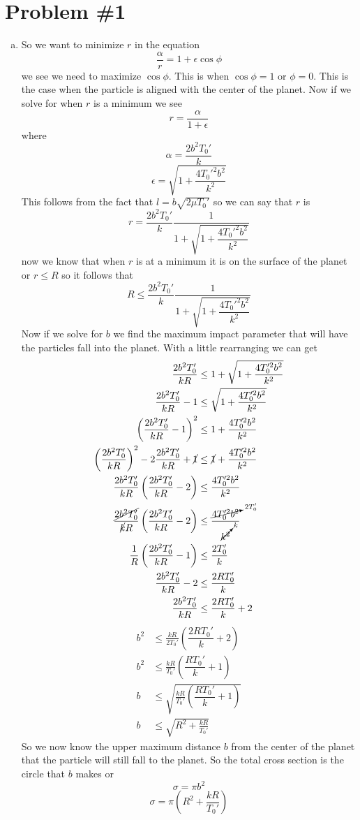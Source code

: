 \documentclass[11pt]{article}
\numberwithin{equation}{section}
\begin{document}


\section{Problem \#1}
\begin{enumerate}[(a)]
\item
So we want to minimize $r$ in the equation
$$\frac{\alpha}{r} = 1+\epsilon\cos\phi$$
we see we need to maximize $\cos\phi$. This is when $\cos\phi=1$ or $\phi=0$. This is the case when the particle is aligned with the center of the planet. Now if we solve for when $r$ is a minimum we see
$$r=\frac{\alpha}{1+\epsilon}$$
where
$$\alpha = \frac{2b^2 T_0'}{k}$$
$$\epsilon = \sqrt{1+\frac{4T_0'^2b^2}{k^2}}$$
This follows from the fact that $l=b\sqrt{2\mu T_0'}$ so we can say that $r$ is
$$r= \frac{2b^2 T_0'}{k}\frac{1}{1+\sqrt{1+\dfrac{4T_0'^2b^2}{k^2}}}$$
now we know that when $r$ is at a minimum it is on the surface of the planet or $r\le R$ so it follows that
$$R \le \frac{2b^2 T_0'}{k}\frac{1}{1+\sqrt{1+\dfrac{4T_0'^2b^2}{k^2}}}$$
Now if we solve for $b$ we find the maximum impact parameter that will have the particles fall into the planet. With a little rearranging we can get
\begin{align*}
\frac{2b^2 T_0'}{kR} &\le {1+\sqrt{1+\dfrac{4T_0'^2b^2}{k^2}}}\\
\frac{2b^2 T_0'}{kR} -1 &\le \sqrt{1+\dfrac{4T_0'^2b^2}{k^2}}\\
\left(\frac{2b^2 T_0'}{kR} -1\right)^2 &\le 1+\dfrac{4T_0'^2b^2}{k^2}\\
\left(\frac{2b^2 T_0'}{kR}\right)^2-2\frac{2b^2 T_0'}{kR}+\cancel{1} &\le \cancel{1}+\dfrac{4T_0'^2b^2}{k^2}\\
\frac{2b^2 T_0'}{kR}\left(\frac{2b^2 T_0'}{kR}-2\right) &\le \dfrac{4T_0'^2b^2}{k^2}\\
\frac{\cancel{2b^2 T_0'}}{\cancel{k}R}\left(\frac{2b^2 T_0'}{kR}-2\right) &\le \dfrac{\cancelto{2T_0'}{4T_0'^2b^2}}{\cancelto{k}{k^2}}\\
\frac{1}{R}\left(\frac{2b^2 T_0'}{kR}-1\right) &\le \dfrac{2T_0'}{k}\\
\frac{2b^2 T_0'}{kR}-2 &\le \dfrac{2RT_0'}{k}\\
\frac{2b^2 T_0'}{kR} &\le \dfrac{2RT_0'}{k}+2
\end{align*}
\begin{align*}
b^2 &\le \frac{kR}{2 T_0'}\left(\dfrac{2RT_0'}{k}+2\right)\\
b^2 &\le \frac{kR}{T_0'}\left(\dfrac{RT_0'}{k}+1\right)\\
b &\le \sqrt{\frac{kR}{T_0'}\left(\dfrac{RT_0'}{k}+1\right)}\\
b &\le \sqrt{R^2+\frac{kR}{T_0'}}
\end{align*}
So we now know the upper maximum distance $b$ from the center of the planet that the particle will still fall to the planet. So  the total cross section is the circle that $b$ makes or
$$\sigma = \pi b^2$$
$$\sigma = \pi \left(R^2+\frac{kR}{T_0'}\right)$$


\end{enumerate}
\end{document}

